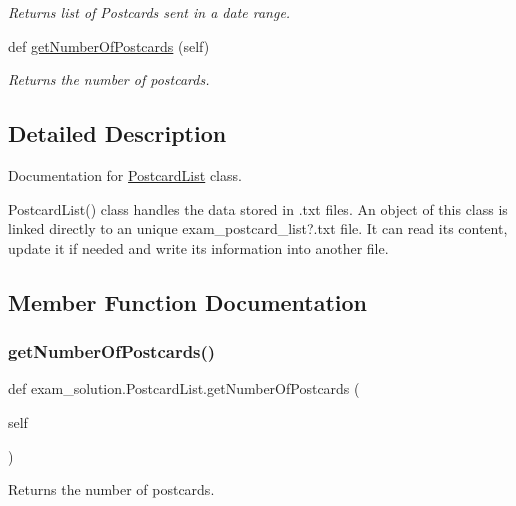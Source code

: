 \begin{DoxyCompactItemize}
\begin{DoxyCompactList}\small\item\em Returns list of Postcards sent in a date range. \end{DoxyCompactList}\item 
def \mbox{\hyperlink{classexam__solution_1_1PostcardList_a45986aa4e3461da3db13c2a0fb1c5528}{get\+Number\+Of\+Postcards}} (self)
\begin{DoxyCompactList}\small\item\em Returns the number of postcards. \end{DoxyCompactList}\end{DoxyCompactItemize}


\subsection{Detailed Description}
Documentation for \mbox{\hyperlink{classexam__solution_1_1PostcardList}{Postcard\+List}} class. 

Postcard\+List() class handles the data stored in .txt files. An object of this class is linked directly to an unique exam\+\_\+postcard\+\_\+list?.txt file. It can read its content, update it if needed and write its information into another file. 

\subsection{Member Function Documentation}
\mbox{\label{classexam__solution_1_1PostcardList_a45986aa4e3461da3db13c2a0fb1c5528}} 
\subsubsection{\texorpdfstring{getNumberOfPostcards()}{getNumberOfPostcards()}}
{\footnotesize\ttfamily def exam\+\_\+solution.\+Postcard\+List.\+get\+Number\+Of\+Postcards (\begin{DoxyParamCaption}\item[{}]{self }\end{DoxyParamCaption})}



Returns the number of postcards. 


